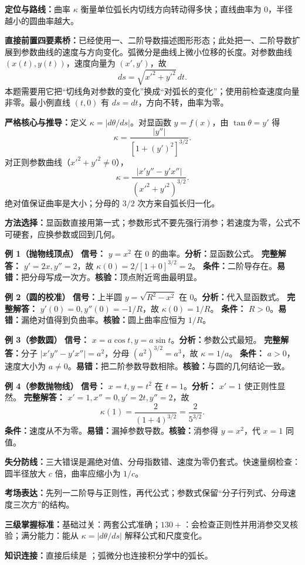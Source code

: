 \begin{knowledgeBox}
\textbf{定位与路线：}曲率 \(\kappa\) 衡量单位弧长内切线方向转动得多快；直线曲率为 \(0\)，半径越小的圆曲率越大。

\textbf{直接前置四要素桥：}已经使用一、二阶导数描述图形形态；此处把一、二阶导数扩展到参数曲线的速度与方向变化。弧微分是曲线上微小位移的长度。对参数曲线 \((x(t),y(t))\)，速度向量为 \((x',y')\)，故
\[
ds=\sqrt{x'^2+y'^2}\,dt.
\]
本题需要用它把“切线角对参数的变化”换成“对弧长的变化”；使用前检查速度向量非零。最小例直线 \((t,0)\) 有 \(ds=dt\)，方向不转，曲率为零。

\textbf{严格核心与推导：}定义 \(\kappa=|d\theta/ds|\)。对显函数 \(y=f(x)\)，由 \(\tan\theta=y'\) 得
\[
\kappa=\frac{|y''|}{[1+(y')^2]^{3/2}}.
\]
对正则参数曲线（\(x'^2+y'^2\ne0\)），
\[
\kappa=\frac{|x'y''-y'x''|}{(x'^2+y'^2)^{3/2}}.
\]
绝对值保证曲率是大小；分母的 \(3/2\) 次方来自弧长归一化。

\textbf{方法选择：}显函数直接用第一式；参数形式不要先强行消参；若速度为零，公式不可硬套，应换参数或回到几何。

\textbf{例 1（抛物线顶点）}\quad
\textbf{信号：} \(y=x^2\) 在 \(0\) 的曲率。\textbf{分析：}显函数公式。
\textbf{完整解答：} \(y'=2x,y''=2\)，故 \(\kappa(0)=2/[1+0]^{3/2}=2\)。
\textbf{条件：}二阶导存在。\textbf{易错：}把分母写成一次方。\textbf{核验：}顶点附近弯曲最明显。

\textbf{例 2（圆的校准）}\quad
\textbf{信号：}上半圆 \(y=\sqrt{R^2-x^2}\) 在 \(0\)。\textbf{分析：}代入显函数式。
\textbf{完整解答：} \(y'(0)=0,y''(0)=-1/R\)，故 \(\kappa(0)=1/R\)。
\textbf{条件：} \(R>0\)。\textbf{易错：}漏绝对值得到负曲率。\textbf{核验：}圆上曲率应恒为 \(1/R\)。

\textbf{例 3（参数圆）}\quad
\textbf{信号：} \(x=a\cos t,y=a\sin t\)。\textbf{分析：}参数公式最短。
\textbf{完整解答：}分子 \(|x'y''-y'x''|=a^2\)，分母 \((a^2)^{3/2}=a^3\)，故 \(\kappa=1/a\)。
\textbf{条件：} \(a>0\)，速度大小为 \(a\ne0\)。\textbf{易错：}把二阶参数导数相除。\textbf{核验：}与圆的几何结论一致。

\textbf{例 4（参数抛物线）}\quad
\textbf{信号：} \(x=t,y=t^2\) 在 \(t=1\)。\textbf{分析：} \(x'=1\) 使正则性显然。
\textbf{完整解答：} \(x'=1,x''=0,y'=2t,y''=2\)，故
\[
\kappa(1)=\frac2{(1+4)^{3/2}}=\frac2{5^{3/2}}.
\]
\textbf{条件：}速度从不为零。\textbf{易错：}漏掉参数导数。\textbf{核验：}消参得 \(y=x^2\)，代 \(x=1\) 同值。

\textbf{失分防线：}三大错误是漏绝对值、分母指数错、速度为零仍套式。快速量纲检查：圆半径放大 \(c\) 倍，曲率应缩小为 \(1/c\)。

\textbf{考场表达：}先列一二阶导与正则性，再代公式；参数式保留“分子行列式、分母速度三次方”的结构。

\textbf{三级掌握标准：}基础过关：两套公式准确；\(130+\)：会检查正则性并用消参交叉核验；满分能力：能从 \(\kappa=|d\theta/ds|\) 解释公式和尺度变化。

\textbf{知识连接：}直接后续是 ；弧微分也连接积分学中的弧长。
\end{knowledgeBox}

